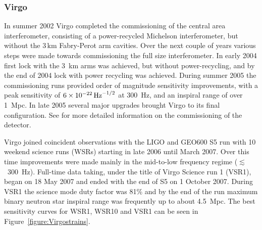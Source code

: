 \documentclass{article}
\begin{document}
\subsubsection{Virgo}
In summer 2002 Virgo completed the commissioning of the central area
interferometer, consisting of a power-recycled Michelson interferometer, but
without the 3\,km Fabry-Perot arm cavities. Over the next couple of years
various steps were made towards commissioning the full size interferometer. In
early 2004 first lock with the 3~km arms was achieved, but without
power-recycling, and by the end of 2004 lock with power recycling was achieved.
During summer 2005 the commissioning runs provided order of magnitude
sensitivity improvements, with a peak sensitivity of $6\times10^{-22}\,{\rm
Hz}^{-1/2}$ at 300~Hz, and an inspiral range of over 1~Mpc. In late 2005
several major upgrades brought Virgo to its final configuration. See
\cite{Acernese:2004, Acernese:2005, Acernese:2006, Acernese:2007} for more
detailed information on the commissioning of the detector.

Virgo joined coincident observations with the LIGO and GEO600 S5 run with 10
weekend science runs (WSRs) starting in late 2006 until March 2007. Over this
time improvements were made mainly in the mid-to-low frequency regime
($\lesssim$~300~Hz). Full-time data taking, under the title of Virgo
Science run 1 (VSR1), began on 18 May 2007 and ended with the end of
S5 on 1 October 2007. During VSR1 the science mode duty factor was
81\% and by the end of the run maximum binary neutron star inspiral
range was frequently up to about 4.5~Mpc. The best sensitivity curves
for WSR1, WSR10 and VSR1 can be seen in Figure~\ref{figure:Virgostrains}.

\end{document}
